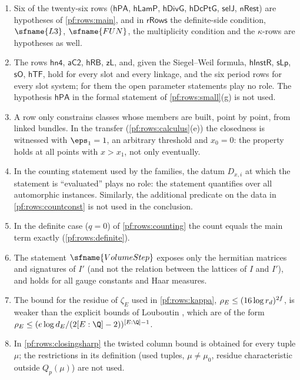 \begin{remark}\label{pf:rows:fidelity}
\begin{enumerate}[label=(\arabic*)]
\item Six of the twenty-six rows ($\mathsf{hPA}$, $\mathsf{hLamP}$, $\mathsf{hDivG}$, $\mathsf{hDcPtG}$, $\mathsf{selJ}$, $\mathsf{nRest}$)
are hypotheses of \cref{pf:rows:main}, and in $\mathsf{rRows}$ the definite-side condition, $\sfname{L3}$, $\sfname{FUN}$, the
multiplicity condition and the $\kappa$-rows are hypotheses as well.
\item The rows $\mathsf{hn4}$, $\mathsf{aC2}$, $\mathsf{hRB}$, $\mathsf{zL}$, and, given the Siegel--Weil formula, $\mathsf{hInstR}$,
$\mathsf{sLp}$, $\mathsf{sO}$, $\mathsf{hTF}$, hold for every slot and every linkage, and the six period rows for every slot system;
for them the open parameter statements play no role. The hypothesis $\mathsf{hPA}$ in the formal statement of
\cref{pf:rows:small}(g) is not used.
\item A row only constrains classes whose members are built, point by point, from linked bundles. In the transfer
(\cref{pf:rows:calculus}(e)) the closedness is witnessed with $\eps_1=1$, an arbitrary threshold and $x_0=0$: the
property holds at all points with $x>x_1$, not only eventually.
\item In the counting statement used by the families, the datum $D_{x,i}$ at which the statement is ``evaluated'' plays no
role: the statement quantifies over all automorphic instances. Similarly, the additional predicate on the data in
\cref{pf:rows:countconst} is not used in the conclusion.
\item In the definite case ($q=0$) of \cref{pf:rows:counting} the count equals the main term exactly
(\cref{pf:rows:definite}).
\item The statement $\sfname{VolumeStep}$ exposes only the hermitian matrices and signatures of $I'$ (and not the relation
between the lattices of $I$ and $I'$), and holds for all gauge constants and Haar measures.
\item The bound for the residue of $\zeta_E$ used in \cref{pf:rows:kappa}, $\rho_E\le(16\log r_d)^{2f}$, is weaker than the
explicit bounds of Louboutin \cite{Louboutin2000}, which are of the form $\rowsRes\le(e\log d_E/(2[E:\Q]-2))^{[E:\Q]-1}$.
\item In \cref{pf:rows:closingsharp} the twisted column bound is obtained for every tuple $\mu$; the restrictions in its
definition (used tuples, $\mu\ne\mu_0$, residue characteristic outside $Q_p(\mu)$) are not used.

\end{enumerate}
\end{remark}
